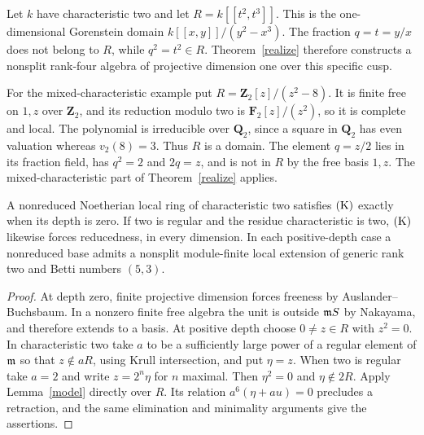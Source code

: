 \begin{example}\label{root-examples}
Let $k$ have characteristic two and let
$R=k[[t^2,t^3]]$.  This is the one-dimensional Gorenstein domain
$k[[x,y]]/(y^2-x^3)$.  The fraction $q=t=y/x$ does not belong to
$R$, while $q^2=t^2\in R$.  Theorem~\ref{realize} therefore constructs a
nonsplit rank-four algebra of projective dimension one over this
specific cusp.

For the mixed-characteristic example put
$R=\mathbf Z_2[z]/(z^2-8)$.  It is finite free on $1,z$ over
$\mathbf Z_2$, and its reduction modulo two is
$\mathbf F_2[z]/(z^2)$, so it is complete and local.  The
polynomial is irreducible over $\mathbf Q_2$, since a square in
$\mathbf Q_2$ has even valuation whereas $v_2(8)=3$.  Thus $R$
is a domain.  The element $q=z/2$ lies in its fraction field,
has $q^2=2$ and $2q=z$, and is not in $R$ by the free basis
$1,z$.  The mixed-characteristic part of Theorem~\ref{realize} applies.
\end{example}
\begin{corollary}
A nonreduced Noetherian local ring of characteristic two satisfies $\mathrm{(K)}$ exactly when its depth is zero. If two is regular and the residue characteristic is two, $\mathrm{(K)}$ likewise forces reducedness, in every dimension. In each positive-depth case a nonreduced base admits a nonsplit module-finite local extension of generic rank two and Betti numbers $(5,3)$.
\end{corollary}
\begin{proof}
At depth zero, finite projective dimension forces freeness by Auslander--Buchsbaum. In a nonzero finite free algebra the unit is outside $\mathfrak m S$ by Nakayama, and therefore extends to a basis. At positive depth choose $0\ne z\in R$ with $z^2=0$. In characteristic two take $a$ to be a sufficiently large power of a regular element of $\mathfrak m$ so that $z\notin aR$, using Krull intersection, and put $\eta=z$. When two is regular take $a=2$ and write $z=2^n\eta$ for $n$ maximal. Then $\eta^2=0$ and $\eta\notin 2R$. Apply Lemma~\ref{model} directly over $R$. Its relation $a^6(\eta+au)=0$ precludes a retraction, and the same elimination and minimality arguments give the assertions.
\end{proof}
